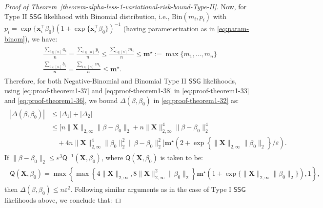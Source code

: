 \documentclass[12pt]{article}
\numberwithin{equation}{section}
\begin{document}
\begin{proof}[Proof of Theorem~\ref{theorem-alpha-less-1-variational-risk-bound-Type-II}]
Now, for Type II $\mathsf{SSG}$ likelihood with Binomial distribution, i.e., $\mathrm{Bin}(m_i, p_i)$ with $p_i = \exp\{\mathbf{x}_i^{\top}\beta_0\}(1 + \exp\{\mathbf{x}_i^{\top}\beta_0\})^{-1}$ (having parameterization as in \eqref{eq:param-binom}), we have:
\begin{align}\label{eq:proof-theorem1-38}
    \begin{split}
        &\frac{\sum_{i\in[n]} a_i}{n} = \frac{\sum_{i\in [n]}y_i}{n} \leq \frac{\sum_{i\in [n]}m_i}{n} \leq \mathbf{m}^{\star} := \max\{m_1, \ldots, m_n\}\\
        &\frac{\sum_{i\in [n]}b_i}{n} = \frac{\sum_{i\in [n]}m_i}{n} \leq \mathbf{m}^{\star}.
    \end{split}
\end{align}
Therefore, for both Negative-Binomial and Binomial Type II $\mathsf{SSG}$ likelihoods, using \eqref{eq:proof-theorem1-37} and \eqref{eq:proof-theorem1-38} in \eqref{eq:proof-theorem1-33} and \eqref{eq:proof-theorem1-36}, we bound $\Delta(\beta, \beta_0)$ in \eqref{eq:proof-theorem1-32} as:
%
\begin{align}\label{eq:proof-theorem1-39}
\begin{split}
|\Delta(\beta, \beta_{0})| &\leq |\Delta_1| + |\Delta_2|\\
&\leq [n\lVert\mathbf{X}\rVert_{2, \infty}\lVert \beta-\beta_0\rVert_{2} + n\lVert\mathbf{X}\rVert_{2, \infty}^{4}\lVert\beta-\beta_0\rVert_{2}^{4}\\
&\quad+ 4n\lVert \mathbf{X}\rVert_{2, \infty}^{4}\lVert\beta_0\rVert_{2}^{2}\lVert\beta-\beta_0\rVert_{2}^{2}] \mathbf{m}^{\star}\left(2 + \exp\left\{\lVert\mathbf{X}\rVert_{2, \infty}\lVert\beta_0\rVert_{2}\right\}/\varepsilon\right).
\end{split}
\end{align}
%
If $\lVert\beta - \beta_0\rVert_2 \leq \varepsilon^3 \mathsf{Q}^{-1}( \mathbf{X}, \beta_0)$, where $\mathsf{Q}(\mathbf{X}, \beta_0)$ is taken to be:
\begin{align}\label{eq:proof-theorem1-40}
    \begin{split}
        \mathsf{Q}(\mathbf{X}, \beta_0) = \max\left\{\max\left\{4\lVert\mathbf{X}\rVert_{2, \infty}, 8\lVert\mathbf{X}\rVert_{2, \infty}^{2}\lVert\beta_0\rVert_{2}\right\}\mathbf{m}^{\star}\left(1 + \exp\{\lVert\mathbf{X}\rVert_{2, \infty}\lVert\beta_0\rVert_{2}\}\right),1\right\},
    \end{split}
\end{align}
then $\Delta(\beta, \beta_0) \leq n\varepsilon^2$. Following similar arguments as in the case of Type I $\mathsf{SSG}$ likelihoods above, we conclude that:

\end{proof}
\end{document}
